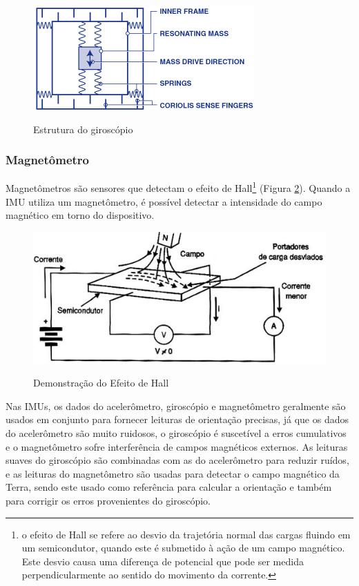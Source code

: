 \begin{figure}[H]
  \setlength{\abovecaptionskip}{0pt}
  \setlength{\belowcaptionskip}{0pt}
  \caption[Estrutura do giroscópio]{Estrutura do giroscópio}
  \centering
  \includegraphics[width=.4\textwidth]{imagem/gyro_vsg1}
  \captionsetup{justification=centering}
  \label{fig:gyro}
\end{figure}

\subsubsection{Magnetômetro}
\label{subsubsec:mag}
Magnetômetros são sensores que detectam o efeito de Hall\footnote{ o efeito de Hall se refere ao desvio da trajetória normal das cargas fluindo em um semicondutor, quando este é submetido à ação de um campo magnético. Este desvio causa uma diferença de potencial que pode ser medida perpendicularmente ao sentido do movimento da corrente.\cite{hall}} (Figura \ref{fig:mag}). Quando a \ac{IMU} utiliza um magnetômetro, é possível detectar a intensidade do campo magnético em torno do dispositivo.

\begin{figure}[H]
  \setlength{\abovecaptionskip}{0pt}
  \setlength{\belowcaptionskip}{0pt}
  \caption[Demonstração do Efeito de Hall]{Demonstração do Efeito de Hall}
  \centering
  \includegraphics[width=.4\textwidth]{imagem/hall}
  \captionsetup{justification=centering}
  \label{fig:mag}
\end{figure}

Nas \ac{IMU}s, os dados do acelerômetro, giroscópio e magnetômetro geralmente são usados em conjunto para fornecer leituras de orientação precisas, já que os dados do acelerômetro são muito ruidosos, o giroscópio é suscetível a erros cumulativos e o magnetômetro sofre interferência de campos magnéticos externos. As leituras suaves do giroscópio são combinadas com as do acelerômetro para reduzir ruídos, e as leituras do magnetômetro são usadas para detectar o campo magnético da Terra, sendo este usado como referência para calcular a orientação e também para corrigir os erros provenientes do giroscópio.%

